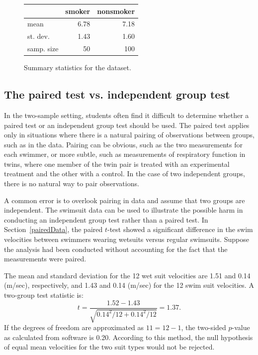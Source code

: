 \begin{figure}[hhh]
	\centering
	\begin{tabular}{lrr}
		& smoker & nonsmoker \\
		\hline
		mean & 6.78 & 7.18 \\
		st. dev. & 1.43 & 1.60 \\
		samp. size & 50 & 100 \\
		\hline
	\end{tabular}
	\caption{Summary statistics for the  dataset.}
	\label{summaryStatsBabySmoke}
\end{figure}		




\textD{\newpage}


\subsection{The paired test vs. independent group test}
\label{pairedVsTwoGroups}

In the two-sample setting, students often find it difficult to determine whether a paired test or an independent group test should be used.  The paired test applies only in situations where there is a natural pairing of observations between groups, such as in the  data. Pairing can be obvious, such as the two measurements for each swimmer, or more subtle, such as measurements of respiratory function in twins, where one member of the twin pair is treated with an experimental treatment and the other with a control. In the case of two independent groups, there is no natural way to pair observations.

A common error is to overlook pairing in data and assume that two groups are independent. The swimsuit data can be used to illustrate the possible harm in conducting an independent group test rather than a paired test. In Section~\ref{pairedData}, the paired $t$-test showed a significant difference in the swim velocities between swimmers wearing wetsuits versus regular swimsuits. Suppose the analysis had been conducted without accounting for the fact that the measurements were paired.

The mean and standard deviation for the 12 wet suit velocities are 1.51 and 0.14 (m/sec), respectively, and 1.43 and 0.14 (m/sec) for the 12 swim suit velocities. A two-group test statistic is:
\[t = \frac{1.52 - 1.43}{\sqrt{0.14^2/12 + 0.14^2/12}} = 1.37. \]
If the degrees of freedom are approximated as $11 = 12 - 1$, the two-sided $p$-value as calculated from software is 0.20. According to this method, the null hypothesis of equal mean velocities for the two suit types would not be rejected.

